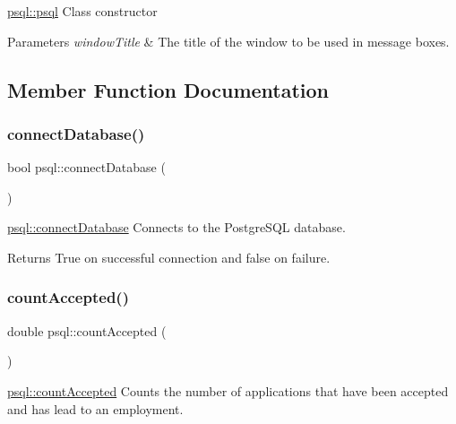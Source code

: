 \hyperlink{classpsql_aaff5fe0931dce097850982e44e6361af}{psql\+::psql} Class constructor 


\begin{DoxyParams}{Parameters}
{\em window\+Title} & The title of the window to be used in message boxes. \\
\hline
\end{DoxyParams}


\subsection{Member Function Documentation}
\mbox{\label{classpsql_ada485c933df77453629e3821ab19fa4c}} 
\subsubsection{\texorpdfstring{connect\+Database()}{connectDatabase()}}
{\footnotesize\ttfamily bool psql\+::connect\+Database (\begin{DoxyParamCaption}{ }\end{DoxyParamCaption})}



\hyperlink{classpsql_ada485c933df77453629e3821ab19fa4c}{psql\+::connect\+Database} Connects to the Postgre\+S\+QL database. 

\begin{DoxyReturn}{Returns}
True on successful connection and false on failure. 
\end{DoxyReturn}
\mbox{\label{classpsql_a0beec2f098edc0961f27774cdd54d09b}} 
\subsubsection{\texorpdfstring{count\+Accepted()}{countAccepted()}}
{\footnotesize\ttfamily double psql\+::count\+Accepted (\begin{DoxyParamCaption}{ }\end{DoxyParamCaption})}



\hyperlink{classpsql_a0beec2f098edc0961f27774cdd54d09b}{psql\+::count\+Accepted} Counts the number of applications that have been accepted and has lead to an employment. 

